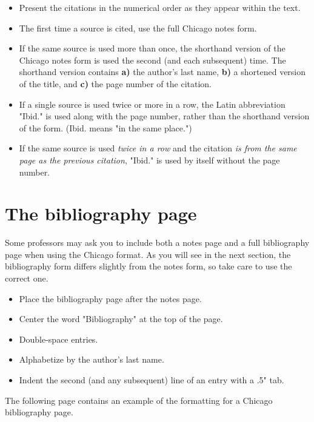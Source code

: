 \begin{itemize}
\item Present the citations in the numerical order as they appear within the text.

\item The first time a source is cited, use the full Chicago notes form.

\item If the same source is used more than once, the shorthand version of the Chicago 
notes form is used the second (and each subsequent) time. The shorthand version 
contains \textbf{a)} the author's last name, \textbf{b)} a shortened version of the title, 
and \textbf{c)} the page number of the citation.

\item If a single source is used twice or more in a row, the Latin abbreviation "Ibid." is 
used along with the page number, rather than the shorthand version of the form. 
(Ibid. means "in the same place.")

\item If the same source is used \emph{twice in a row} and the citation \emph{is from 
the same page as the previous citation}, "Ibid." is used by itself without the 
page number. 
\end{itemize}


\section{The bibliography page}
Some professors may ask you to include both a notes page and a full bibliography page 
when using the Chicago format. As you will see in the next section, the bibliography 
form differs slightly from the notes form, so take care to use the correct one.

\begin{itemize}
\item Place the bibliography page after the notes page.
\item Center the word "Bibliography" at the top of the page.
\item Double-space entries.
\item Alphabetize by the author's last name.
\item Indent the second (and any subsequent) line of an entry with a .5" tab.
\end{itemize}

The following page contains an example of the formatting for a Chicago bibliography 
page.
\newpage



